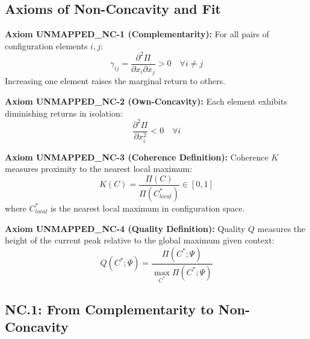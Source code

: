 
\subsection{Axioms of Non-Concavity and Fit}
\label{sec:nc-axioms}

\begin{tcolorbox}[colback=gray!5!white, colframe=gray!75!black]
\textbf{Axiom UNMAPPED_NC-1 (Complementarity):}
For all pairs of configuration elements $i, j$:
\begin{equation}
\gamma_{ij} = \frac{\partial^2 \Pi}{\partial x_i \partial x_j} > 0 \quad \forall i \neq j
\label{ax:nc-1}
\end{equation}
Increasing one element raises the marginal return to others.

\textbf{Axiom UNMAPPED_NC-2 (Own-Concavity):}
Each element exhibits diminishing returns in isolation:
\begin{equation}
\frac{\partial^2 \Pi}{\partial x_i^2} < 0 \quad \forall i
\label{ax:nc-2}
\end{equation}

\textbf{Axiom UNMAPPED_NC-3 (Coherence Definition):}
Coherence $K$ measures proximity to the nearest local maximum:
\begin{equation}
K(C) = \frac{\Pi(C)}{\Pi(C^*_{local})} \in [0, 1]
\label{ax:nc-3}
\end{equation}
where $C^*_{local}$ is the nearest local maximum in configuration space.

\textbf{Axiom UNMAPPED_NC-4 (Quality Definition):}
Quality $Q$ measures the height of the current peak relative to the global maximum given context:
\begin{equation}
Q(C^*; \Psi) = \frac{\Pi(C^*; \Psi)}{\max_{C^*} \Pi(C^*; \Psi)}
\label{ax:nc-4}
\end{equation}
\end{tcolorbox}


\subsection{NC.1: From Complementarity to Non-Concavity}
\label{sec:nc-nonconcavity}

